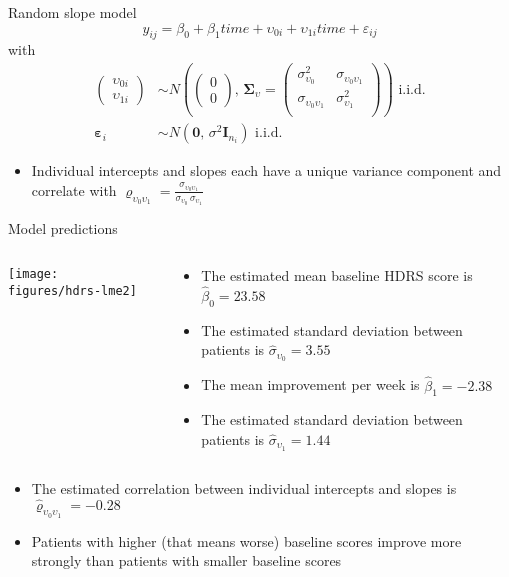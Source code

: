 \documentclass[aspectratio=169]{beamer}
\newcommand{\vect}[1]{\mathbf{#1}}
\newcommand{\mat}[1]{\mathbf{#1}}
\newcommand{\gvect}[1]{\boldsymbol{#1}}
\newcommand{\gmat}[1]{\boldsymbol{#1}}
\begin{document}
\begin{frame}[fragile]{Random slope model}
  \[
    y_{ij} = \beta_0 + \beta_1 time + \upsilon_{0i} + \upsilon_{1i} time +
    \varepsilon_{ij}
  \]
with
\begin{align*}
  \begin{pmatrix} \upsilon_{0i}\\ \upsilon_{1i} \end{pmatrix} &\sim
    N \left(\begin{pmatrix} 0\\ 0 \end{pmatrix}, \, \gmat{\Sigma}_\upsilon =
      \begin{pmatrix}
        \sigma^2_{\upsilon_0} & \sigma_{\upsilon_0 \upsilon_1} \\
        \sigma_{\upsilon_0 \upsilon_1} & \sigma^2_{\upsilon_1} \\
      \end{pmatrix} \right)
    \text{ i.i.d.} \\
  \gvect{\varepsilon}_i &\sim N(\vect{0}, \, \sigma^2 \mat{I}_{n_i})
    \text{ i.i.d.}
\end{align*}
  \begin{itemize}
    \item Individual intercepts and slopes each have a unique variance
      component and correlate with $\varrho_{\upsilon_0 \upsilon_1} =
      \frac{\sigma_{\upsilon_0 \upsilon_1}}{\sigma_{\upsilon_0} \,
      \sigma_{\upsilon_1}}$
  \end{itemize}
\end{frame}

\begin{frame}{Model predictions}
\begin{columns}
\begin{column}{.4\textwidth}
\texttt{[image: figures/hdrs-lme2]}
\end{column}
%
\begin{column}{.6\textwidth}
  \begin{itemize}
    \item The estimated mean baseline HDRS score is $\hat{\beta}_0 = 23.58$
    \item The estimated standard deviation between patients is
      $\hat{\sigma}_{\upsilon_0} = 3.55$
    \item The mean improvement per week is $\hat{\beta}_1 = -2.38$
    \item The estimated standard deviation between patients is
      $\hat{\sigma}_{\upsilon_1} = 1.44$
  \end{itemize}
\end{column}
\end{columns}
  \begin{itemize}
    \item The estimated correlation between individual intercepts and
      slopes is $\hat{\varrho}_{\upsilon_0 \upsilon_1} = -0.28$
    \item Patients with higher (that means worse) baseline scores improve
      more strongly than patients with smaller baseline scores
  \end{itemize}
\end{frame}
\end{document}
